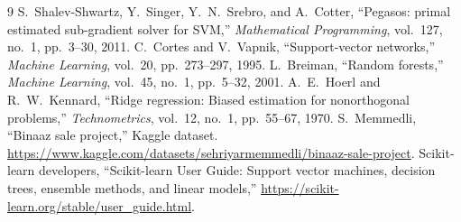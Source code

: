 \documentclass[10pt,twocolumn,a4paper]{article}
\begin{document}
\begin{thebibliography}{9}
S.~Shalev-Shwartz, Y.~Singer, Y.~N.~Srebro, and A.~Cotter,
``Pegasos: primal estimated sub-gradient solver for SVM,''
\emph{Mathematical Programming}, vol.~127, no.~1, pp.~3--30, 2011.
C.~Cortes and V.~Vapnik, ``Support-vector networks,''
\emph{Machine Learning}, vol.~20, pp.~273--297, 1995.
L.~Breiman, ``Random forests,''
\emph{Machine Learning}, vol.~45, no.~1, pp.~5--32, 2001.
A.~E.~Hoerl and R.~W.~Kennard, ``Ridge regression: Biased estimation
for nonorthogonal problems,'' \emph{Technometrics}, vol.~12, no.~1,
pp.~55--67, 1970.
S.~Memmedli, ``Binaaz sale project,'' Kaggle dataset.
\url{https://www.kaggle.com/datasets/sehriyarmemmedli/binaaz-sale-project}.
Scikit-learn developers, ``Scikit-learn User Guide: Support vector
machines, decision trees, ensemble methods, and linear models,''
\url{https://scikit-learn.org/stable/user_guide.html}.
\end{thebibliography}
\end{document}

